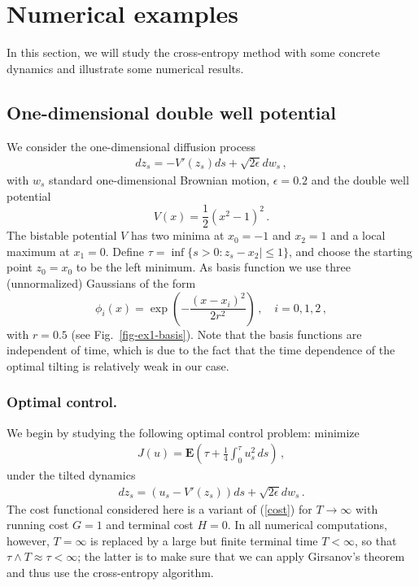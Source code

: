 \documentclass[final]{siamltex}
\newcommand{\bE}{{\mathbf E}}
\newcommand{\eps}{\epsilon}
\begin{document}
\section{Numerical examples}
\label{sec-examples}
In this section, we will study the cross-entropy method with some concrete dynamics and
illustrate some numerical results.
\subsection{One-dimensional double well potential}
We consider the one-dimensional diffusion process 
\begin{align}
  dz_s = - V'(z_s) ds + \sqrt{2\eps } dw_s\,,
\end{align}
with $w_s$ standard one-dimensional Brownian motion, $\eps=0.2$  and the double well potential 
\begin{equation}
V(x) = \frac{1}{2}(x^2 - 1)^2\,.
\end{equation}
The bistable potential $V$ has two minima at $x_0 = -1$ and $x_2 = 1$ and a local maximum at $x_1 = 0$. Define $\tau = \inf\{s >0 \colon z_s - x_2| \le 1 \}$, and choose
the starting point $z_0 = x_0$ to be the left minimum. As basis function we use three (unnormalized) Gaussians of the form
\begin{equation}
\phi_i(x) = \exp\left(-\frac{(x - x_i)^2}{2r^2}\right)\,,\quad i = 0, 1, 2\,,
\end{equation}
with $r = 0.5$ (see Fig.~\ref{fig-ex1-basis}). Note that the basis functions are independent of time, which is due to the fact that the time dependence of the optimal tilting is relatively weak in our case.  
 
 \subsubsection*{Optimal control.}
 
We begin by studying the following optimal control problem: minimize   
\begin{align}
  J(u) = \bE \left(\tau + \frac{1}{4} \int_0^{\tau}  u_s^2 \,ds \right)\,,
  \label{ex1-cost}
\end{align}
under the tilted dynamics
\begin{align}
  dz_s = \left( u_{s} - V'(z_s) \right) ds + \sqrt{2\eps } dw_s\,.
\end{align}
The cost functional considered here is a variant of (\ref{cost}) for
$T\to\infty$ with running cost $G=1$ and terminal cost $H=0$. In all numerical computations, however, $T=\infty$ is replaced by a large but finite terminal time $T<\infty$, so that $\tau\wedge T\approx \tau <\infty$; the latter is to make sure that we can apply Girsanov's theorem and thus use the cross-entropy algorithm. 
\end{document}

